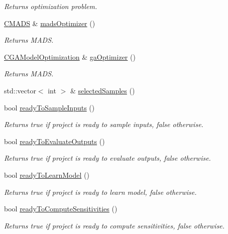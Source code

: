 \begin{DoxyCompactItemize}
\begin{DoxyCompactList}\small\item\em Returns optimization problem. \end{DoxyCompactList}\item 
\hyperlink{class_c_m_a_d_s}{C\-M\-A\-D\-S} \& \hyperlink{class_go_s_u_m_1_1_c_container_a58efe49433f7ca1358b62bb14a3e0674}{mads\-Optimizer} ()
\begin{DoxyCompactList}\small\item\em Returns M\-A\-D\-S. \end{DoxyCompactList}\item 
\hyperlink{class_c_g_a_model_optimization}{C\-G\-A\-Model\-Optimization} \& \hyperlink{class_go_s_u_m_1_1_c_container_a42e6d9cc6a2c47b1fb16beaa72fcac26}{ga\-Optimizer} ()
\begin{DoxyCompactList}\small\item\em Returns M\-A\-D\-S. \end{DoxyCompactList}\item 
std\-::vector$<$ int $>$ \& \hyperlink{class_go_s_u_m_1_1_c_container_a8f9cc0a02d2cfebccd2a01f9115be170}{selected\-Samples} ()
\item 
bool \hyperlink{class_go_s_u_m_1_1_c_container_a55f90d3ae5a1bef2e7c4686b5abc5321}{ready\-To\-Sample\-Inputs} ()
\begin{DoxyCompactList}\small\item\em Returns true if project is ready to sample inputs, false otherwise. \end{DoxyCompactList}\item 
bool \hyperlink{class_go_s_u_m_1_1_c_container_ad9ef8b5a02e6a9dda354361ffe6b2ddf}{ready\-To\-Evaluate\-Outputs} ()
\begin{DoxyCompactList}\small\item\em Returns true if project is ready to evaluate outputs, false otherwise. \end{DoxyCompactList}\item 
bool \hyperlink{class_go_s_u_m_1_1_c_container_a0890310299b413991d15e7c5da39f2a5}{ready\-To\-Learn\-Model} ()
\begin{DoxyCompactList}\small\item\em Returns true if project is ready to learn model, false otherwise. \end{DoxyCompactList}\item 
bool \hyperlink{class_go_s_u_m_1_1_c_container_a7f6b3fc22312e911e617b03fdc4a2656}{ready\-To\-Compute\-Sensitivities} ()
\begin{DoxyCompactList}\small\item\em Returns true if project is ready to compute sensitivities, false otherwise. \end{DoxyCompactList}\item 

\end{DoxyCompactItemize}
